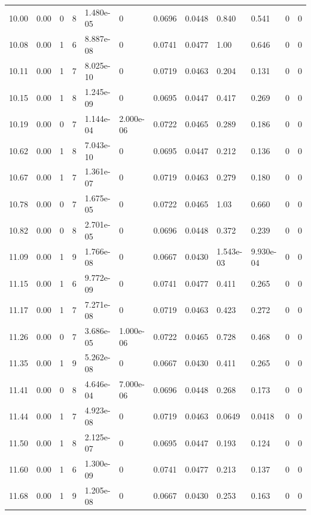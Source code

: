 \documentclass[preview]{standalone}
\begin{document}
{{{{\begin{tabular}{L{1.2cm}C{1.2cm} C{0.3cm}C{0.5cm} C{1.4cm}C{1.4cm} C{1.4cm}C{1.4cm} C{1.6cm}C{1.6cm} C{1.6cm}C{1.6cm}}
  10.00  &  0.00  & 0     &  8 &  1.480e-05  & 0  &  0.0696&   0.0448& 0.840 & 0.541   &  0 & 0  \\ 
  10.08  &  0.00  & 1     &  6 &  8.887e-08  & 0  &  0.0741&   0.0477& 1.00 & 0.646   &  0 & 0  \\ 
  10.11  &  0.00  & 1     &  7 &  8.025e-10  & 0  &  0.0719&   0.0463& 0.204 & 0.131   &  0 & 0  \\ 
  10.15  &  0.00  & 1     &  8 &  1.245e-09  & 0  &  0.0695&   0.0447& 0.417 & 0.269   &  0 & 0  \\ 
  10.19  &  0.00  & 0     &  7 &  1.144e-04  & 2.000e-06  &  0.0722&   0.0465& 0.289 & 0.186   &  0 & 0  \\ 
  10.62  &  0.00  & 1     &  8 &  7.043e-10  & 0  &  0.0695&   0.0447& 0.212 & 0.136   &  0 & 0  \\ 
  10.67  &  0.00  & 1     &  7 &  1.361e-07  & 0  &  0.0719&   0.0463& 0.279 & 0.180   &  0 & 0  \\ 
  10.78  &  0.00  & 0     &  7 &  1.675e-05  & 0  &  0.0722&   0.0465& 1.03 & 0.660   &  0 & 0  \\ 
  10.82  &  0.00  & 0     &  8 &  2.701e-05  & 0  &  0.0696&   0.0448& 0.372 & 0.239   &  0 & 0  \\ 
  11.09  &  0.00  & 1     &  9 &  1.766e-08  & 0  &  0.0667&   0.0430& 1.543e-03 & 9.930e-04   &  0 & 0  \\ 
  11.15  &  0.00  & 1     &  6 &  9.772e-09  & 0  &  0.0741&   0.0477& 0.411 & 0.265   &  0 & 0  \\ 
  11.17  &  0.00  & 1     &  7 &  7.271e-08  & 0  &  0.0719&   0.0463& 0.423 & 0.272   &  0 & 0  \\ 
  11.26  &  0.00  & 0     &  7 &  3.686e-05  & 1.000e-06  &  0.0722&   0.0465& 0.728 & 0.468   &  0 & 0  \\ 
  11.35  &  0.00  & 1     &  9 &  5.262e-08  & 0  &  0.0667&   0.0430& 0.411 & 0.265   &  0 & 0  \\ 
  11.41  &  0.00  & 0     &  8 &  4.646e-04  & 7.000e-06  &  0.0696&   0.0448& 0.268 & 0.173   &  0 & 0  \\ 
  11.44  &  0.00  & 1     &  7 &  4.923e-08  & 0  &  0.0719&   0.0463& 0.0649 & 0.0418   &  0 & 0  \\ 
  11.50  &  0.00  & 1     &  8 &  2.125e-07  & 0  &  0.0695&   0.0447& 0.193 & 0.124   &  0 & 0  \\ 
  11.60  &  0.00  & 1     &  6 &  1.300e-09  & 0  &  0.0741&   0.0477& 0.213 & 0.137   &  0 & 0  \\ 
  11.68  &  0.00  & 1     &  9 &  1.205e-08  & 0  &  0.0667&   0.0430& 0.253 & 0.163   &  0 & 0  \\ 

\end{tabular}}}}}
\end{document}
